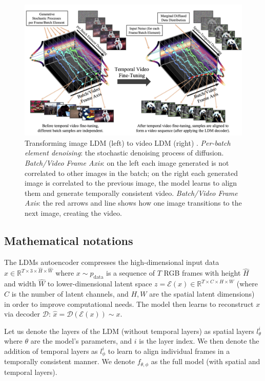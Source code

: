 \begin{figure}
    \centering
    \includegraphics[width=1\textwidth]{images/video_ldm/image_to_video_tuning.png}
    \caption{Transforming image LDM (left) to video LDM (right) \cite{video_ldm}. \textit{Per-batch element denoising}: the stochastic denoising process of diffusion. \textit{Batch/Video Frame Axis}: on the left each image generated is not correlated to other images in the batch; on the right each generated image is correlated to the previous image, the model learns to align them and generate temporally consistent video. \textit{Batch/Video Frame Axis}: the red arrows and line shows how one image transitions to the next image, creating the video.}
    \label{fig:video_ldm_image_to_video_tuning}
\end{figure}

\subsection*{Mathematical notations}

The LDMs autoencoder compresses the high-dimensional input data $x \in \mathbb{R}^{T \times 3 \times \hat{H} \times \hat{W}}$ where $x \sim p_{\text{data}}$ is a sequence of $T$ RGB frames with height $\hat{H}$ and width $\hat{W}$ to lower-dimensional latent space $z = \mathcal{E} (x) \in \mathbb{R}^{T \times C \times H \times W}$ (where $C$ is the number of latent channels, and $H, W$ are the spatial latent dimensions) in order to improve computational needs. The model then learns to reconstruct $x$ via decoder $\mathcal{D}$: $\hat{x} = \mathcal{D} (\mathcal{E} (x)) \sim x$.

Let us denote the layers of the LDM (without temporal layers) as spatial layers $l^i_{\theta}$ where $\theta$ are the model's parameters, and $i$ is the layer index. We then denote the addition of temporal layers as $l^i_{\phi}$ to learn to align individual frames in a temporally consistent manner. We denote $f_{\theta, \phi}$ as the full model (with spatial and temporal layers).

